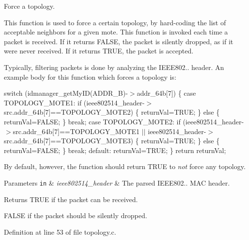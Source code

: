 Force a topology. 

This function is used to force a certain topology, by hard-\/coding the list of acceptable neighbors for a given mote. This function is invoked each time a packet is received. If it returns F\+A\+L\+SE, the packet is silently dropped, as if it were never received. If it returns T\+R\+UE, the packet is accepted.

Typically, filtering packets is done by analyzing the I\+E\+E\+E802.. header. An example body for this function which forces a topology is\+:

switch (idmanager\+\_\+get\+My\+I\+D(\+A\+D\+D\+R\+\_\+B)-\/$>$addr\+\_\+64b\mbox{[}7\mbox{]}) \{ case T\+O\+P\+O\+L\+O\+G\+Y\+\_\+\+M\+O\+T\+E1\+: if (ieee802514\+\_\+header-\/$>$src.\+addr\+\_\+64b\mbox{[}7\mbox{]}==T\+O\+P\+O\+L\+O\+G\+Y\+\_\+\+M\+O\+T\+E2) \{ return\+Val=T\+R\+UE; \} else \{ return\+Val=F\+A\+L\+SE; \} break; case T\+O\+P\+O\+L\+O\+G\+Y\+\_\+\+M\+O\+T\+E2\+: if (ieee802514\+\_\+header-\/$>$src.\+addr\+\_\+64b\mbox{[}7\mbox{]}==T\+O\+P\+O\+L\+O\+G\+Y\+\_\+\+M\+O\+T\+E1 $\vert$$\vert$ ieee802514\+\_\+header-\/$>$src.\+addr\+\_\+64b\mbox{[}7\mbox{]}==T\+O\+P\+O\+L\+O\+G\+Y\+\_\+\+M\+O\+T\+E3) \{ return\+Val=T\+R\+UE; \} else \{ return\+Val=F\+A\+L\+SE; \} break; default\+: return\+Val=T\+R\+UE; \} return return\+Val;

By default, however, the function should return T\+R\+UE to {\itshape not} force any topology.


\begin{DoxyParams}[1]{Parameters}
\mbox{\tt in}  & {\em ieee802514\+\_\+header} & The parsed I\+E\+E\+E802.. M\+AC header.\\
\hline
\end{DoxyParams}
\begin{DoxyReturn}{Returns}
T\+R\+UE if the packet can be received. 

F\+A\+L\+SE if the packet should be silently dropped. 
\end{DoxyReturn}


Definition at line 53 of file topology.\+c.

